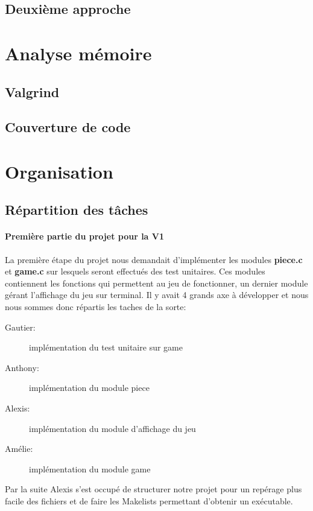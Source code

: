 \documentclass{report}
\begin{document}
\section{Deuxième approche}



\chapter{Analyse mémoire}
\setcounter{section}{0}
\section{Valgrind}

\section{Couverture de code}



\chapter{Organisation}
\setcounter{section}{0}
\section{Répartition des tâches}
\subsubsection*{Première partie du projet pour la V1}
La première étape du projet nous demandait d'implémenter les modules \textbf{piece.c} et \textbf{game.c} sur lesquels seront effectués des test unitaires. Ces modules contiennent les fonctions qui permettent au jeu de fonctionner, un dernier module gérant l'affichage du jeu sur terminal. Il y avait 4 grands axe à développer et nous nous sommes donc répartis les taches de la sorte:
\begin{description}
\item [Gautier:] implémentation du test unitaire sur game
\item [Anthony:] implémentation du module piece
\item [Alexis:] implémentation du module d'affichage du jeu
\item [Amélie:] implémentation du module game
\end{description}
Par la suite Alexis s'est occupé de structurer notre projet pour un repérage plus facile des fichiers et de faire les Makelists permettant d'obtenir un exécutable.
\end{document}
